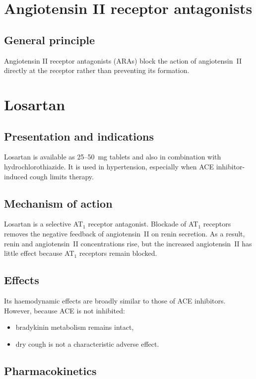 \documentclass[11pt,a4paper]{article}
\begin{document}
\section{Angiotensin II receptor antagonists}

\subsection{General principle}

Angiotensin II receptor antagonists (ARAs) block the action of angiotensin~II directly at the receptor rather than preventing its formation.

\section{Losartan}

\subsection{Presentation and indications}

Losartan is available as 25--50~mg tablets and also in combination with hydrochlorothiazide. It is used in hypertension, especially when ACE inhibitor-induced cough limits therapy.

\subsection{Mechanism of action}

Losartan is a selective AT$_1$ receptor antagonist. Blockade of AT$_1$ receptors removes the negative feedback of angiotensin~II on renin secretion. As a result, renin and angiotensin~II concentrations rise, but the increased angiotensin~II has little effect because AT$_1$ receptors remain blocked.

\subsection{Effects}

Its haemodynamic effects are broadly similar to those of ACE inhibitors. However, because ACE is not inhibited:
\begin{itemize}
    \item bradykinin metabolism remains intact,
    \item dry cough is not a characteristic adverse effect.
\end{itemize}

\subsection{Pharmacokinetics}
\end{document}
